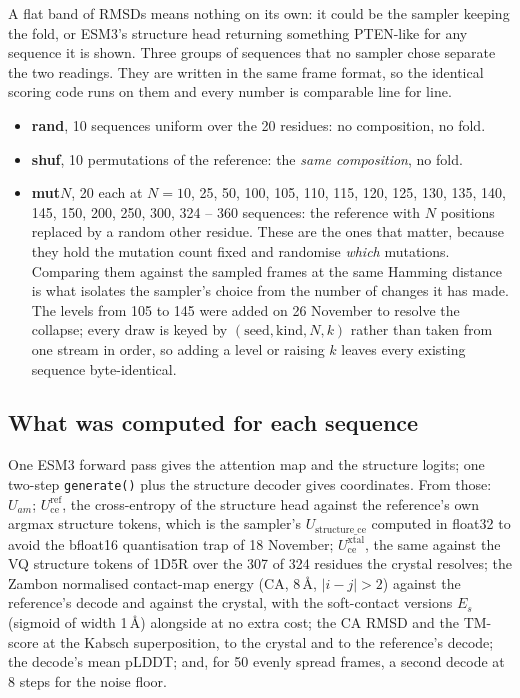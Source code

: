 \documentclass[11pt,a4paper]{article}
\begin{document}
A flat band of RMSDs means nothing on its own: it could be the sampler keeping the fold, or
ESM3's structure head returning something PTEN-like for any sequence it is shown. Three
groups of sequences that no sampler chose separate the two readings. They are written in
the same frame format, so the identical scoring code runs on them and every number is
comparable line for line.

\begin{itemize}
\item \textbf{rand}, 10 sequences uniform over the 20 residues: no composition, no fold.
\item \textbf{shuf}, 10 permutations of the reference: the \emph{same composition}, no fold.
\item \textbf{mut$N$}, 20 each at $N = 10$, 25, 50, 100, 105, 110, 115, 120, 125, 130, 135,
140, 145, 150, 200, 250, 300, 324 -- 360 sequences: the reference with $N$ positions
replaced by a random other residue. These are the ones that matter, because they hold the
mutation count fixed and randomise \emph{which} mutations. Comparing them against the
sampled frames at the same Hamming distance is what isolates the sampler's choice from the
number of changes it has made. The levels from 105 to 145 were added on 26 November to
resolve the collapse; every draw is keyed by $(\text{seed}, \text{kind}, N, k)$ rather than
taken from one stream in order, so adding a level or raising $k$ leaves every existing
sequence byte-identical.
\end{itemize}

\subsection{What was computed for each sequence}

One ESM3 forward pass gives the attention map and the structure logits; one two-step
\texttt{generate()} plus the structure decoder gives coordinates. From those: $U_{am}$;
$U_{\mathrm{ce}}^{\mathrm{ref}}$, the cross-entropy of the structure head against the
reference's own argmax structure tokens, which is the sampler's $U_{\mathrm{structure\_ce}}$
computed in float32 to avoid the bfloat16 quantisation trap of 18 November;
$U_{\mathrm{ce}}^{\mathrm{xtal}}$, the same against the VQ structure tokens of 1D5R over the
307 of 324 residues the crystal resolves; the Zambon normalised contact-map energy (CA,
8\,\AA, $|i-j|>2$) against the reference's decode and against the crystal, with the
soft-contact versions $E_s$ (sigmoid of width 1\,\AA) alongside at no extra cost; the CA
RMSD and the TM-score at the Kabsch superposition, to the crystal and to the reference's
decode; the decode's mean pLDDT; and, for 50 evenly spread frames, a second decode at 8
steps for the noise floor.
\end{document}
